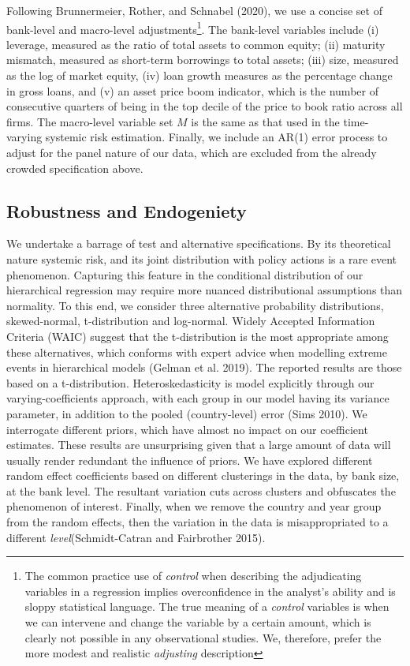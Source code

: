 \documentclass[
  10pt,
]{article}
\begin{document}
Following Brunnermeier, Rother, and Schnabel (2020), we use a concise
set of bank-level and macro-level adjustments\footnote{The common
  practice use of \emph{control} when describing the adjudicating
  variables in a regression implies overconfidence in the analyst's
  ability and is sloppy statistical language. The true meaning of a
  \emph{control} variables is when we can intervene and change the
  variable by a certain amount, which is clearly not possible in any
  observational studies. We, therefore, prefer the more modest and
  realistic \emph{adjusting} description}. The bank-level variables
include (i) leverage, measured as the ratio of total assets to common
equity; (ii) maturity mismatch, measured as short-term borrowings to
total assets; (iii) size, measured as the log of market equity, (iv)
loan growth measures as the percentage change in gross loans, and (v) an
asset price boom indicator, which is the number of consecutive quarters
of being in the top decile of the price to book ratio across all firms.
The macro-level variable set \(M\) is the same as that used in the
time-varying systemic risk estimation. Finally, we include an AR(1)
error process to adjust for the panel nature of our data, which are
excluded from the already crowded specification above.

\hypertarget{robustness-and-endogeniety}{%
\subsection{Robustness and
Endogeniety}\label{robustness-and-endogeniety}}

We undertake a barrage of test and alternative specifications. By its
theoretical nature systemic risk, and its joint distribution with policy
actions is a rare event phenomenon. Capturing this feature in the
conditional distribution of our hierarchical regression may require more
nuanced distributional assumptions than normality. To this end, we
consider three alternative probability distributions, skewed-normal,
t-distribution and log-normal. Widely Accepted Information Criteria
(WAIC) suggest that the t-distribution is the most appropriate among
these alternatives, which conforms with expert advice when modelling
extreme events in hierarchical models (Gelman et al. 2019). The reported
results are those based on a t-distribution. Heteroskedasticity is model
explicitly through our varying-coefficients approach, with each group in
our model having its variance parameter, in addition to the pooled
(country-level) error (Sims 2010). We interrogate different priors,
which have almost no impact on our coefficient estimates. These results
are unsurprising given that a large amount of data will usually render
redundant the influence of priors. We have explored different random
effect coefficients based on different clusterings in the data, by bank
size, at the bank level. The resultant variation cuts across clusters
and obfuscates the phenomenon of interest. Finally, when we remove the
country and year group from the random effects, then the variation in
the data is misappropriated to a different \emph{level}(Schmidt-Catran
and Fairbrother 2015).
\end{document}
